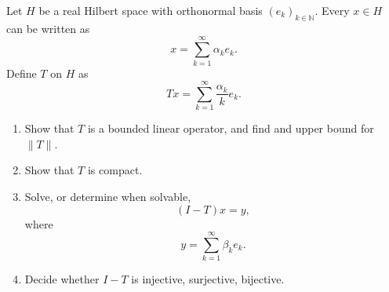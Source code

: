 \begin{prob}
    Let $H$ be a real Hilbert space with orthonormal basis 
    $(e_k)_{k\in\mathbb N}$. Every $x \in H$ can be 
    written as 
    \[
        x = \sum_{k=1}^\infty \alpha_k e_k. 
    \]
    Define $T$ on $H$ as 
    \[
        Tx = \sum_{k=1}^\infty \frac{\alpha_k}{k}e_k. 
    \]
    \begin{enumerate}[label=\alph*)]
        \item Show that $T$ is a bounded linear operator, 
            and find and upper bound for $\|T\|$.
        \item Show that $T$ is compact. 
        \item Solve, or determine when solvable, 
            \[
                (I-T)x = y, 
            \]
            where 
            \[
                y = \sum_{k=1}^\infty \beta_k e_k. 
            \]
        \item Decide whether $I-T$ is injective, surjective,  
            bijective. 
    \end{enumerate}
\end{prob}

